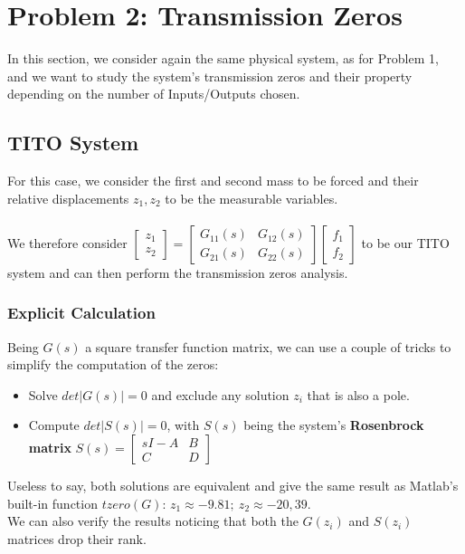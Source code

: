 \documentclass[a4paper, 12pt]{article}
\begin{document}
\section{Problem 2: Transmission Zeros}
In this section, we consider again the same physical system, as for Problem 1, and we want to study the system's transmission zeros and their property depending on the number of Inputs/Outputs chosen.
\subsection{TITO System}
For this case, we consider the  first and second mass to be forced and their relative displacements $z_1,z_2$ to be the measurable variables.
\\\\
We therefore consider
$\begin{bmatrix}
z_1\\
z_2
\end{bmatrix} = 
\begin{bmatrix}
G_{11}(s) & G_{12}(s)\\
G_{21}(s) & G_{22}(s)
\end{bmatrix}
\begin{bmatrix}
f_1\\
f_2
\end{bmatrix}$
to be our TITO system and can then perform the transmission zeros analysis.
\subsubsection{Explicit Calculation}
Being $G(s)$ a square transfer function matrix, we can use a couple of tricks to simplify the computation of the zeros:
\begin{itemize}
    \item Solve $det|G(s)| = 0$ and exclude any solution $z_i$ that is also a pole.
    \item Compute $det|S(s)| = 0$, with $S(s)$ being the system's \textbf{Rosenbrock matrix}  
$S(s) = 
\begin{bmatrix}
sI-A & B\\
C & D
\end{bmatrix}$
\end{itemize}
Useless to say, both solutions are equivalent and give the same result as Matlab's built-in function $tzero(G)$: 
$z_1 \approx -9.81;\ z_2 \approx -20,39$. 
\\ We can also verify the results noticing that both the $G(z_i)$ and $S(z_i)$ matrices drop their rank.
\end{document}
